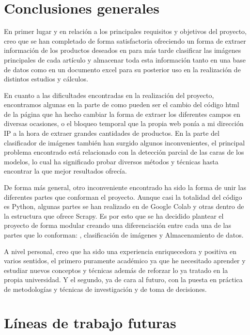 
\section{Conclusiones generales}
En primer lugar y en relación a los principales requisitos y objetivos del proyecto, creo que se han completado de forma satisfactoria ofreciendo un forma de extraer información de los productos deseados en  para más tarde clasificar las imágenes principales de cada artículo y almacenar toda esta información tanto en una base de datos como en un documento excel para su posterior uso en la realización de distintos estudios y cálculos.

En cuanto a las dificultades encontradas en la realización del proyecto, encontramos algunas en la parte de  como pueden ser el cambio del código html de la página que ha hecho cambiar la forma de extraer los diferentes campos en diversas ocasiones, o el bloqueo temporal que la propia web ponía a mi dirección IP a la hora de extraer grandes cantidades de productos. En la parte del clasificador de imágenes también han surgido algunos inconvenientes, el principal problema encontrado está relacionado con la detección parcial de las caras de los modelos, lo cual ha significado probar diversos métodos y técnicas hasta encontrar la que mejor resultados ofrecía.

De forma más general, otro inconveniente encontrado ha sido la forma de unir las diferentes partes que conforman el proyecto. Aunque casi la totalidad del código es Python, algunas partes se han realizado en  de Google Colab y otras dentro de la estructura que ofrece Scrapy. Es por esto que se ha decidido plantear el proyecto de forma modular creando una diferenciación entre cada una de las partes que lo conforman: , clasificación de imágenes y Almacenamiento de datos.

A nivel personal, creo que ha sido una experiencia enriquecedora y positiva en varios sentidos, el primero puramente académico ya que he necesitado aprender y estudiar nuevos conceptos y técnicas además de reforzar lo ya tratado en la propia universidad. Y el segundo, ya de cara al futuro, con la puesta en práctica de metodologías y técnicas de investigación y de toma de decisiones.

\section{Líneas de trabajo futuras}

